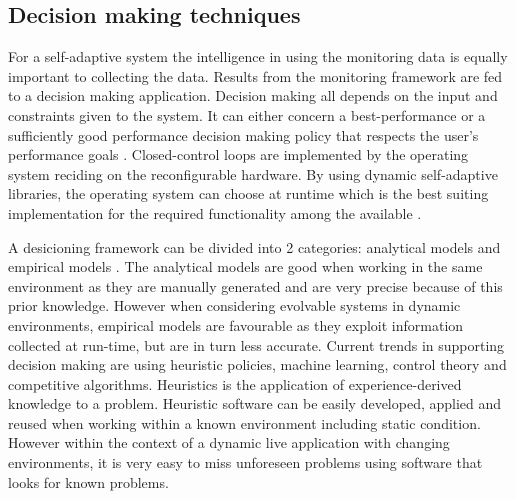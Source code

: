 \subsection{Decision making techniques}
\label{sec:decisions}

For a self-adaptive system the intelligence in using the monitoring data is equally important to collecting the data. Results from the monitoring framework are fed to a decision making application.  Decision making all depends on the input and constraints given to the system. It can either concern a best-performance or a sufficiently good performance decision making policy that respects the user's performance goals \cite{evolvable}. Closed-control loops are implemented by the operating system reciding on the reconfigurable hardware. By using dynamic self-adaptive libraries, the operating system can choose at runtime which is the best suiting implementation for the required functionality among the available \cite{evolvable}.

A desicioning framework can be divided into 2 categories: analytical models and empirical models \cite{evolvable}. The analytical models are good when working in the same environment as they are manually generated and are very precise because of this prior knowledge. However when considering evolvable systems in dynamic environments, empirical models are favourable as they exploit information collected at run-time, but are in turn less accurate.
Current trends in supporting decision making are using heuristic policies, machine learning, control theory and competitive algorithms. Heuristics is the application of experience-derived knowledge to a problem. Heuristic software can be easily developed, applied and reused when working within a known environment including static condition. However within the context of a dynamic live application with changing environments, it is very easy to miss unforeseen problems using software that looks for known problems.

